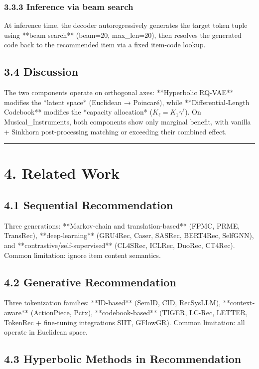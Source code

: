 \documentclass[11pt]{article}
\begin{document}
\subsubsection{3.3.3 Inference via beam search}

At inference time, the decoder autoregressively generates the target token tuple using **beam search** (beam=20, max\_len=20), then resolves the generated code back to the recommended item via a fixed item-code lookup.


\subsection{3.4 Discussion}

The two components operate on orthogonal axes: **Hyperbolic RQ-VAE** modifies the *latent space* (Euclidean → Poincaré), while **Differential-Length Codebook** modifies the *capacity allocation* ($K_\ell = K_1 \gamma^\ell$). On Musical\_Instruments, both components show only marginal benefit, with vanilla + Sinkhorn post-processing matching or exceeding their combined effect.

\noindent\rule{\textwidth}{0.4pt}


\section{4. Related Work}


\subsection{4.1 Sequential Recommendation}

Three generations: **Markov-chain and translation-based** (FPMC, PRME, TransRec), **deep-learning** (GRU4Rec, Caser, SASRec, BERT4Rec, SelfGNN), and **contrastive/self-supervised** (CL4SRec, ICLRec, DuoRec, CT4Rec). Common limitation: ignore item content semantics.


\subsection{4.2 Generative Recommendation}

Three tokenization families: **ID-based** (SemID, CID, RecSysLLM), **context-aware** (ActionPiece, Pctx), **codebook-based** (TIGER, LC-Rec, LETTER, TokenRec + fine-tuning integrations SIIT, GFlowGR). Common limitation: all operate in Euclidean space.


\subsection{4.3 Hyperbolic Methods in Recommendation}
\end{document}
